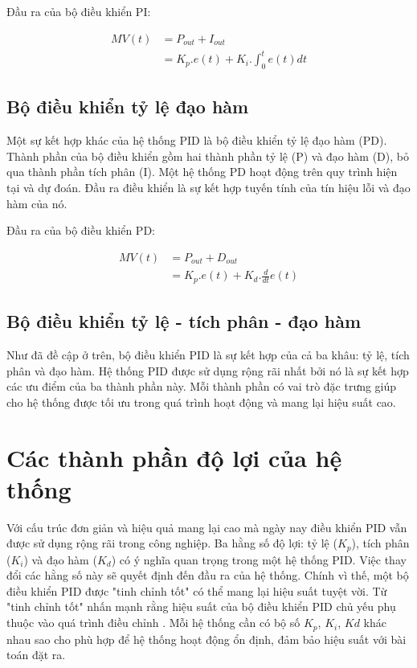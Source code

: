 \newpage

Đầu ra của bộ điều khiển PI:

\begin{align}
	MV(t) &= P_{out} + I_{out}    \\
	&= K_p.e(t) + K_i.\int_{0}^{t}e(t)dt 
\end{align}

\subsection{Bộ điều khiển tỷ lệ đạo hàm}

Một sự kết hợp khác của hệ thống PID là bộ điều khiển tỷ lệ đạo hàm (PD). Thành phần của bộ điều khiển gồm hai thành phần tỷ lệ (P) và đạo hàm (D), bỏ qua thành phần tích phân (I). Một hệ thống PD hoạt động trên quy trình hiện tại và dự đoán. Đầu ra điều khiển là sự kết hợp tuyến tính của tín hiệu lỗi và đạo hàm của nó.

Đầu ra của bộ điều khiển PD:

\begin{align}
	MV(t) &= P_{out} + D_{out}   \\
	&= K_p.e(t) + K_d.\frac{d}{dt}e(t)
\end{align}


\subsection{Bộ điều khiển tỷ lệ - tích phân - đạo hàm}

Như đã đề cập ở trên, bộ điều khiển PID là sự kết hợp của cả ba khâu: tỷ lệ, tích phân và đạo hàm. Hệ thống PID được sử dụng rộng rãi nhất bởi nó là sự kết hợp các ưu điểm của ba thành phần này. Mỗi thành phần có vai trò đặc trưng giúp cho hệ thống được tối ưu trong quá trình hoạt động và mang lại hiệu suất cao.

\section{Các thành phần độ lợi của hệ thống}
Với cấu trúc đơn giản và hiệu quả mang lại cao mà ngày nay điều khiển PID vẫn được sử dụng rộng rãi trong công nghiệp. Ba hằng số độ lợi: tỷ lệ ($K_p$), tích phân ($K_i$) và đạo hàm ($K_d$) có ý nghĩa quan trọng trong một hệ thống PID. Việc thay đổi các hằng số này sẽ quyết định đến đầu ra của hệ thống. Chính vì thế, một bộ điều khiển PID được "tinh chỉnh tốt" có thể mang lại hiệu suất tuyệt vời. Từ "tinh chỉnh tốt" nhấn mạnh rằng hiệu suất của bộ điều khiển PID chủ yếu phụ thuộc vào quá trình điều chỉnh \cite{aastrom2001future}. Mỗi hệ thống cần có bộ số $K_p$, $K_i$, $Kd$ khác nhau sao cho phù hợp để hệ thống hoạt động ổn định, đảm bảo hiệu suất với bài toán đặt ra.

